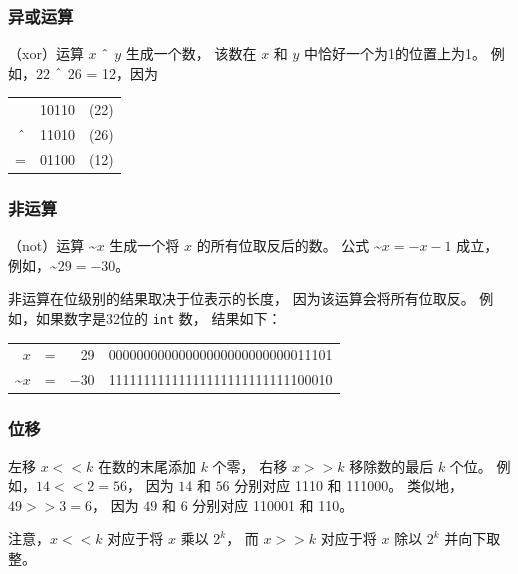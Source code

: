 \subsubsection{异或运算}


（xor）运算 $x$ $\XOR$ $y$ 生成一个数，
该数在 $x$ 和 $y$ 中恰好一个为1的位置上为1。
例如，$22$ $\XOR$ $26$ = 12，因为

\begin{center}
\begin{tabular}{rrr}
& 10110 & (22)\\
$\XOR$ & 11010 & (26) \\
\hline
 = & 01100 & (12) \\
\end{tabular}
\end{center}

\subsubsection{非运算}


（not）运算 \textasciitilde$x$
生成一个将 $x$ 的所有位取反后的数。
公式 \textasciitilde$x = -x-1$ 成立，
例如，\textasciitilde$29 = -30$。

非运算在位级别的结果取决于位表示的长度，
因为该运算会将所有位取反。
例如，如果数字是32位的 \texttt{int} 数，
结果如下：

\begin{center}
\begin{tabular}{rrrr}
$x$ & = & 29 &   00000000000000000000000000011101 \\
\textasciitilde$x$ & = & $-30$ & 11111111111111111111111111100010 \\
\end{tabular}
\end{center}

\subsubsection{位移}


左移 $x < < k$ 在数的末尾添加 $k$ 个零，
右移 $x > > k$ 移除数的最后 $k$ 个位。
例如，$14 < < 2 = 56$，
因为 $14$ 和 $56$ 分别对应 1110 和 111000。
类似地，$49 > > 3 = 6$，
因为 $49$ 和 $6$ 分别对应 110001 和 110。

注意，$x < < k$
对应于将 $x$ 乘以 $2^k$，
而 $x > > k$
对应于将 $x$ 除以 $2^k$
并向下取整。

